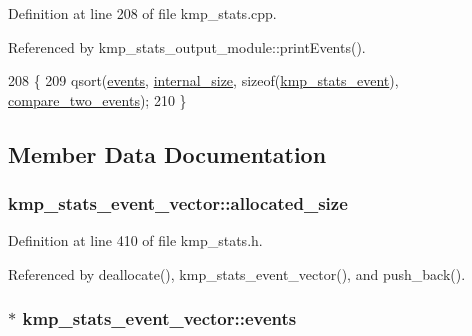 Definition at line 208 of file kmp\-\_\-stats.\-cpp.



Referenced by kmp\-\_\-stats\-\_\-output\-\_\-module\-::print\-Events().


\begin{DoxyCode}
208                                   \{
209     qsort(\hyperlink{classkmp__stats__event__vector_aaae9f631d4d74f138fc6d2aa57ed9ed6}{events}, \hyperlink{classkmp__stats__event__vector_ab81d47b204c28205c304661fadc92009}{internal\_size}, \textcolor{keyword}{sizeof}(\hyperlink{classkmp__stats__event}{kmp\_stats\_event}), 
      \hyperlink{kmp__stats_8cpp_a03149d6f07c69340c9a230882f740fed}{compare\_two\_events});
210 \}
\end{DoxyCode}


\subsection{Member Data Documentation}
\hypertarget{classkmp__stats__event__vector_a5afeb1aa530bc09efb9edbff32bc203c}{
\subsubsection[{allocated\-\_\-size}]{ kmp\-\_\-stats\-\_\-event\-\_\-vector\-::allocated\-\_\-size\hspace{0.3cm}{\ttfamily [private]}}}\label{classkmp__stats__event__vector_a5afeb1aa530bc09efb9edbff32bc203c}


Definition at line 410 of file kmp\-\_\-stats.\-h.



Referenced by deallocate(), kmp\-\_\-stats\-\_\-event\-\_\-vector(), and push\-\_\-back().

\hypertarget{classkmp__stats__event__vector_aaae9f631d4d74f138fc6d2aa57ed9ed6}{
\subsubsection[{events}]{$\ast$ kmp\-\_\-stats\-\_\-event\-\_\-vector\-::events\hspace{0.3cm}{\ttfamily [private]}}}\label{classkmp__stats__event__vector_aaae9f631d4d74f138fc6d2aa57ed9ed6}


